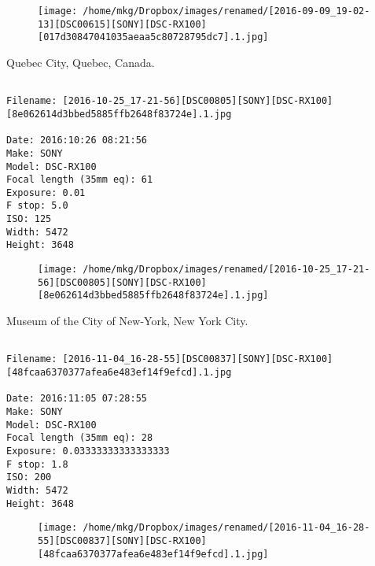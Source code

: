 \begin{figure}
\texttt{[image: /home/mkg/Dropbox/images/renamed/[2016-09-09\_19-02-13][DSC00615][SONY][DSC-RX100][017d30847041035aeaa5c80728795dc7].1.jpg]}
\end{figure}
    
\clearpage
\onecolumn
\noindent Quebec City, Quebec, Canada.
\noindent
\begin{lstlisting}

Filename: [2016-10-25_17-21-56][DSC00805][SONY][DSC-RX100][8e062614d3bbed5885ffb2648f83724e].1.jpg

Date: 2016:10:26 08:21:56
Make: SONY
Model: DSC-RX100
Focal length (35mm eq): 61
Exposure: 0.01
F stop: 5.0
ISO: 125
Width: 5472
Height: 3648
\end{lstlisting}
\clearpage

\begin{figure}
\texttt{[image: /home/mkg/Dropbox/images/renamed/[2016-10-25\_17-21-56][DSC00805][SONY][DSC-RX100][8e062614d3bbed5885ffb2648f83724e].1.jpg]}
\end{figure}
    
\clearpage
\onecolumn
\noindent Museum of the City of New-York, New York City.
\noindent
\begin{lstlisting}

Filename: [2016-11-04_16-28-55][DSC00837][SONY][DSC-RX100][48fcaa6370377afea6e483ef14f9efcd].1.jpg

Date: 2016:11:05 07:28:55
Make: SONY
Model: DSC-RX100
Focal length (35mm eq): 28
Exposure: 0.03333333333333333
F stop: 1.8
ISO: 200
Width: 5472
Height: 3648
\end{lstlisting}
\clearpage

\begin{figure}
\texttt{[image: /home/mkg/Dropbox/images/renamed/[2016-11-04\_16-28-55][DSC00837][SONY][DSC-RX100][48fcaa6370377afea6e483ef14f9efcd].1.jpg]}
\end{figure}
    
